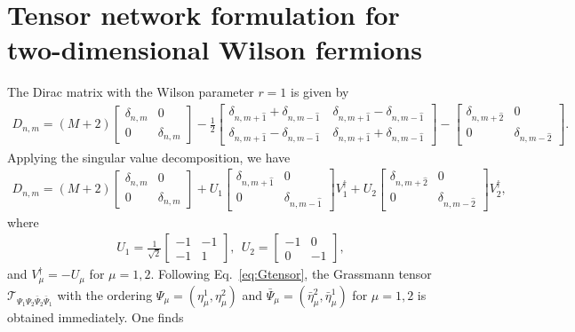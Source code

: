 
\section{Tensor network formulation for two-dimensional Wilson fermions}
\label{sec:wilson}

The Dirac matrix with the Wilson parameter $r=1$ is given by
\begin{align}
	D_{n,m}=(M+2)
\begin{bmatrix}
	\delta_{n,m} & 0 \\
	0 & \delta_{n,m}
\end{bmatrix}
-\frac{1}{2}
\begin{bmatrix}
	\delta_{n,m+\hat{1}}+\delta_{n,m-\hat{1}} & ~\delta_{n,m+\hat{1}}-\delta_{n,m-\hat{1}} \\
	\delta_{n,m+\hat{1}}-\delta_{n,m-\hat{1}} & ~\delta_{n,m+\hat{1}}+\delta_{n,m-\hat{1}}
\end{bmatrix}
-
\begin{bmatrix}
	\delta_{n,m+\hat{2}} & 0 \\
	0 & \delta_{n,m-\hat{2}}
\end{bmatrix}
.
\end{align}
Applying the singular value decomposition, we have
\begin{align}
	D_{n,m}=(M+2)
\begin{bmatrix}
	\delta_{n,m} & 0 \\
	0 & \delta_{n,m}
\end{bmatrix}
+U_{1}
\begin{bmatrix}
	\delta_{n,m+\hat{1}} & 0 \\
	0 & \delta_{n,m-\hat{1}}
\end{bmatrix}
V_{1}^{\dagger}+
U_{2}
\begin{bmatrix}
	\delta_{n,m+\hat{2}} & 0 \\
	0 & \delta_{n,m-\hat{2}}
\end{bmatrix}
V_{2}^{\dagger}
,
\end{align}
where
\begin{align}
	U_{1}=\frac{1}{\sqrt{2}}
\begin{bmatrix}
	-1 & -1 \\
	-1 & 1
\end{bmatrix}
,~~
	U_{2}=
\begin{bmatrix}
	-1 & 0 \\
	0 & -1
\end{bmatrix}
,
\end{align}
and $V_{\mu}^{\dagger}=-U_{\mu}$ for $\mu=1,2$. Following Eq.~\eqref{eq:Gtensor}, the Grassmann tensor $\mathcal{T}_{\Psi_1\Psi_2\bar{\Psi}_2\bar{\Psi}_1}$ with the ordering $\Psi_\mu=(\eta^{1}_{\mu},\eta^{2}_{\mu})$ and $\bar{\Psi}_{\mu}=(\bar{\eta}^{2}_{\mu},\bar{\eta}^{1}_{\mu})$ for $\mu=1,2$ is obtained immediately. One finds
